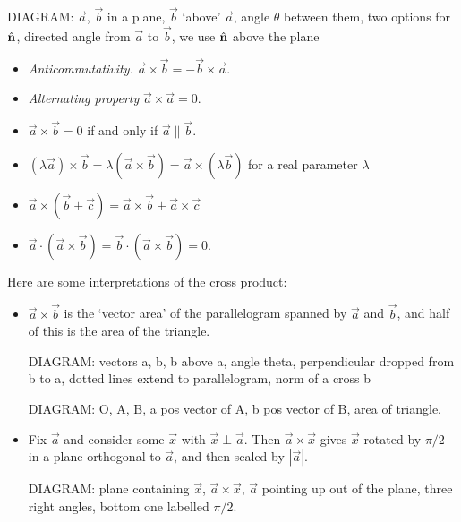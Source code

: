 \documentclass{../template/note}
\begin{document}
    
    
    
    DIAGRAM: \(\vec a\), \(\vec b\) in a plane, \(\vec b\) `above' \(\vec a\), angle \(\theta\) between them, two options for \(\hvec n\), directed angle from \(\vec a\) to \(\vec b\), we use \(\hvec n\) above the plane

    \begin{itemize}
        \item \emph{Anticommutativity.} \(\vec a \times \vec b = -\vec b \times \vec a\).
        \item \emph{Alternating property} \(\vec a \times \vec a = 0\).
        \item \(\vec a \times \vec b = 0\) if and only if \(\vec a \parallel \vec b\).
        \item \((\lambda \vec a) \times \vec b = \lambda (\vec a \times \vec b) = \vec a \times (\lambda \vec b)\) for a real parameter \(\lambda\)
        \item \(\vec a \times (\vec b + \vec c) = \vec a \times \vec b + \vec a \times \vec c\)
        \item \(\vec a \cdot (\vec a \times \vec b) = \vec b \cdot (\vec a \times \vec b) = 0\).
    \end{itemize}
    
    Here are some interpretations of the cross product:

    \begin{itemize}
        \item \(\vec a \times \vec b\) is the `vector area' of the parallelogram spanned by \(\vec a\) and \(\vec b\), and half of this is the area of the triangle.
        
    
        DIAGRAM: vectors a, b, b above a, angle theta, perpendicular dropped from b to a, dotted lines extend to parallelogram, norm of a cross b

        DIAGRAM: O, A, B, a pos vector of A, b pos vector of B, area of triangle.

    \end{itemize}
    

    \begin{itemize}[resume]
        \item Fix \(\vec a\) and consider some \(\vec x\) with \(\vec x \perp \vec a\). Then \(\vec a \times \vec x\) gives \(\vec x\) rotated by \(\pi/2\) in a plane orthogonal to \(\vec a\), and then scaled by \(|\vec a|\).
        
        DIAGRAM: plane containing \(\vec x\), \(\vec a \times \vec x\), \(\vec a\) pointing up out of the plane, three right angles, bottom one labelled \(\pi/2\).
    \end{itemize}
    
\end{document}
